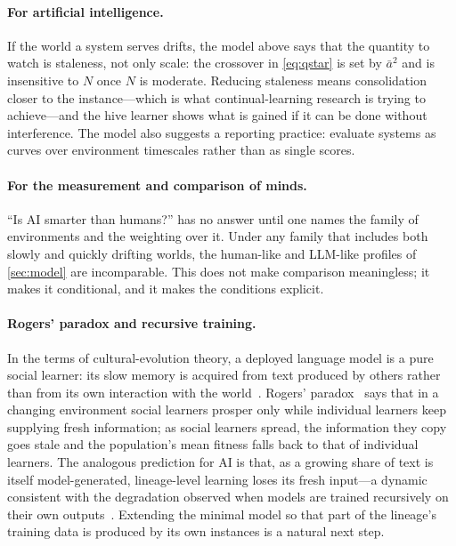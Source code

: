 \documentclass[11pt]{article}
\theoremstyle{plain}
\theoremstyle{definition}
\theoremstyle{remark}
\newcommand{\abar}{\bar a}
\begin{document}
\paragraph{For artificial intelligence.}
If the world a system serves drifts, the model above says that the quantity to watch is staleness, not only scale: the crossover in \eqref{eq:qstar} is set by $\abar^2$ and is insensitive to $N$ once $N$ is moderate. Reducing staleness means consolidation closer to the instance---which is what continual-learning research is trying to achieve---and the hive learner shows what is gained if it can be done without interference. The model also suggests a reporting practice: evaluate systems as curves over environment timescales rather than as single scores.

\paragraph{For the measurement and comparison of minds.}
``Is AI smarter than humans?'' has no answer until one names the family of environments and the weighting over it. Under any family that includes both slowly and quickly drifting worlds, the human-like and LLM-like profiles of \cref{sec:model} are incomparable. This does not make comparison meaningless; it makes it conditional, and it makes the conditions explicit.

\paragraph{Rogers' paradox and recursive training.}
In the terms of cultural-evolution theory, a deployed language model is a pure social learner: its slow memory is acquired from text produced by others rather than from its own interaction with the world~\citep{farrell2025large,yiu2024transmission}. Rogers' paradox~\citep{rogers1988does,rendell2010rogers} says that in a changing environment social learners prosper only while individual learners keep supplying fresh information; as social learners spread, the information they copy goes stale and the population's mean fitness falls back to that of individual learners. The analogous prediction for AI is that, as a growing share of text is itself model-generated, lineage-level learning loses its fresh input---a dynamic consistent with the degradation observed when models are trained recursively on their own outputs~\citep{shumailov2024ai}. Extending the minimal model so that part of the lineage's training data is produced by its own instances is a natural next step.
\end{document}
